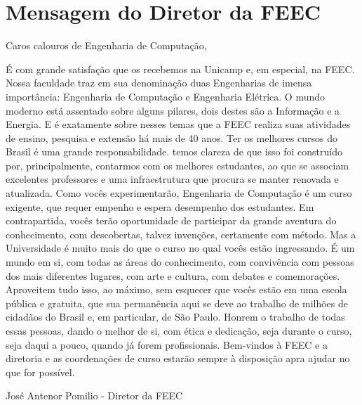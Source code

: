 
\section{Mensagem do Diretor da FEEC}

Caros calouros de Engenharia de Computação,

É com grande satisfação que os recebemos na Unicamp e, em especial, na FEEC.
Nossa faculdade traz em sua denominação duas Engenharias de imensa importância:
Engenharia de Computação e Engenharia Elétrica.  O mundo moderno está assentado
sobre alguns pilares, dois destes são a Informação e a Energia.  E é exatamente
sobre nesses temas que a FEEC realiza suas atividades de ensino, pesquisa e
extensão há mais de 40 anos.  Ter os melhores cursos do Brasil é uma grande
responsabilidade. temos clareza de que isso foi construído por, principalmente,
contarmos com os melhores estudantes, ao que se associam excelentes professores
e uma infraestrutura que procura se manter renovada e atualizada.  Como vocês
experimentarão, Engenharia de Computação é um curso exigente, que requer
empenho e espera desempenho dos estudantes. Em contrapartida, vocês terão
oportunidade de participar da grande aventura do conhecimento, com descobertas,
talvez invenções, certamente com método.  Mas a Universidade é muito mais do
que o curso no qual vocês estão ingressando. É um mundo em si, com todas as
áreas do conhecimento, com convivência com pessoas dos mais diferentes lugares,
com arte e cultura, com debates e comemorações.  Aproveitem tudo isso, ao
máximo, sem esquecer que vocês estão em uma escola pública e gratuita, que sua
permanência aqui se deve ao trabalho de milhões de cidadãos do Brasil e, em
particular, de São Paulo. Honrem o trabalho de todas essas pessoas, dando o
melhor de si, com ética e dedicação, seja durante o curso, seja daqui a pouco,
quando já forem profissionais.  Bem-vindos à FEEC e a diretoria e as
coordenações de curso estarão sempre à disposição apra ajudar no que for
possível.


José Antenor Pomilio - Diretor da FEEC
